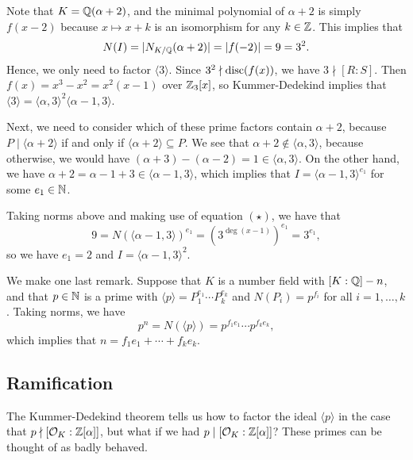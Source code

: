 Note that $K = \mathbb{Q}(\alpha + 2)$, and the minimal polynomial of $\alpha + 2$ is simply $f(x - 2)$ 
because $x \mapsto x + k$ is an isomorphism for any $k \in \mathbb{Z}$. This implies that 
\[ N(I) = |N_{K/\mathbb{Q}}(\alpha + 2)| = |f(-2)| = 9 = 3^2. \] 
Hence, we only need to factor $\langle 3 \rangle$. Since $3^2 \nmid \operatorname{disc}(f(x))$, 
we have $3 \nmid [R : S]$. Then $f(x) = x^3 - x^2 = x^2(x - 1)$ over $\mathbb{Z}_3[x]$, 
so Kummer-Dedekind implies that $\langle 3 \rangle = \langle \alpha, 3 \rangle^2 
\langle \alpha - 1, 3 \rangle$. 

Next, we need to consider which of these prime factors contain 
$\alpha + 2$, because $P \mid \langle \alpha + 2 \rangle$ if and only if 
$\langle \alpha + 2 \rangle \subseteq P$. We see that $\alpha + 2 
\notin \langle \alpha, 3 \rangle$, because otherwise, we would have 
$(\alpha + 3) - (\alpha - 2) = 1 \in \langle \alpha, 3 \rangle$. 
On the other hand, we have $\alpha + 2 = \alpha - 1 + 3 \in \langle 
\alpha - 1, 3 \rangle$, which implies that $I = \langle \alpha-1, 3 
\rangle^{e_1}$ for some $e_1 \in \mathbb{N}$. 

Taking norms above and making use of equation $(\star)$, we have that 
\[ 9 = N(\langle \alpha - 1, 3 \rangle)^{e_1} = (3^{\deg(x-1)})^{e_1} 
= 3^{e_1}, \]
so we have $e_1 = 2$ and $I = \langle \alpha-1, 3 \rangle^2$. 

We make one last remark. Suppose that $K$ is a number field with 
$[K : \mathbb{Q}] - n$, and that $p \in \mathbb{N}$ is a prime with 
$\langle p \rangle = P_1^{e_1} \cdots P_k^{e_k}$ and $N(P_i) = p^{f_i}$
for all $i = 1, \dots, k$. Taking norms, we have 
\[ p^n = N(\langle p \rangle) = p^{f_1e_1} \cdots p^{f_ke_k}, \]
which implies that $n = f_1 e_1 + \cdots + f_k e_k$. 

\subsection{Ramification} \label{subsec:3.10}
The Kummer-Dedekind theorem tells us how to factor the ideal 
$\langle p \rangle$ in the case that $p \nmid [\mathcal{O}_K : \mathbb{Z}[\alpha]]$, 
but what if we had $p \mid [\mathcal{O}_K : \mathbb{Z}[\alpha]]$? These 
primes can be thought of as badly behaved. 


